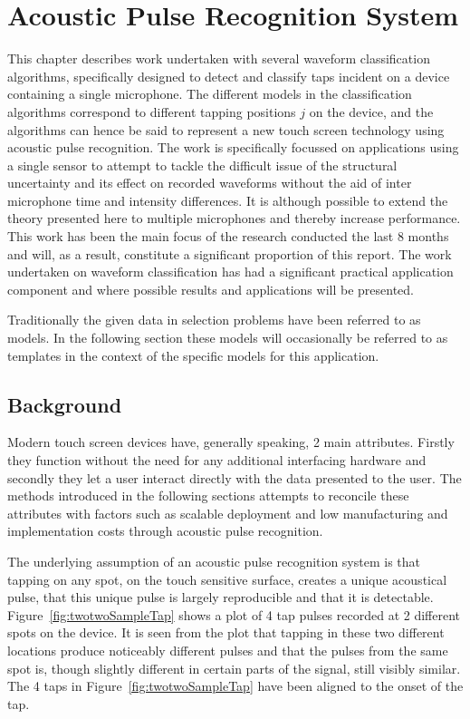 \chapter{Acoustic Pulse Recognition System}\label{ch:APR}

\ifpdf
    \graphicspath{{Chapter3_APR/Chapter3Figs/PNG/}{Chapter3_APR/Chapter3Figs/PDF/}{Chapter3_APR/Chapter3Figs/}}
\else
    \graphicspath{{Chapter3_APR/Chapter3Figs/EPS/}{Chapter3_APR/Chapter3Figs/}}
\fi


This chapter describes work undertaken with several waveform classification algorithms, specifically designed to detect and classify taps incident on a device containing a single microphone. The different models in the classification algorithms correspond to different tapping positions $j$ on the device, and the algorithms can hence be said to represent a new touch screen technology using acoustic pulse recognition. The work is specifically focussed on applications using a single sensor to attempt to tackle the difficult issue of the structural uncertainty and its effect on recorded waveforms without the aid of inter microphone time and intensity differences. It is although possible to extend the theory presented here to multiple microphones and thereby increase performance.
This work has been the main focus of the research conducted the last 8 months and will, as a result, constitute a significant proportion of this report. The work undertaken on waveform classification has had a significant practical application component and where possible results and applications will be presented.

Traditionally the given data in selection problems have been referred to as models. In the following section these models will occasionally be referred to as templates in the context of the specific models for this application.

\section{Background}
Modern touch screen devices have, generally speaking, 2 main attributes. Firstly they function without the need for any additional interfacing hardware and secondly they let a user interact directly with the data presented to the user. The methods introduced in the following sections attempts to reconcile these attributes with factors such as scalable deployment and low manufacturing and implementation costs through acoustic pulse recognition.

The underlying assumption of an acoustic pulse recognition system is that tapping on any spot, on the touch sensitive surface, creates a unique acoustical pulse, that this unique pulse is largely reproducible and that it is detectable. Figure~\ref{fig:twotwoSampleTap} shows a plot of 4 tap pulses recorded at 2 different spots on the device. It is seen from the plot that tapping in these two different locations produce noticeably different pulses and that the pulses from the same spot is, though slightly different in certain parts of the signal, still visibly similar. The 4 taps in Figure~\ref{fig:twotwoSampleTap} have been aligned to the onset of the tap.


